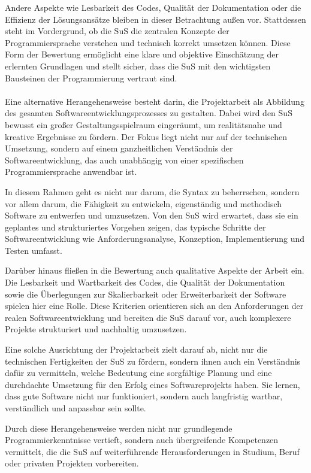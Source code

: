 \documentclass[a4paper,12pt]{article}
\begin{document}
Andere Aspekte wie Lesbarkeit des Codes, Qualität der Dokumentation oder die Effizienz der Lösungsansätze bleiben in dieser Betrachtung außen vor. Stattdessen steht im Vordergrund, ob die SuS die zentralen Konzepte der Programmiersprache verstehen und technisch korrekt umsetzen können. Diese Form der Bewertung ermöglicht eine klare und objektive Einschätzung der erlernten Grundlagen und stellt sicher, dass die SuS mit den wichtigsten Bausteinen der Programmierung vertraut sind.\\
\\

Eine alternative Herangehensweise besteht darin, die Projektarbeit als Abbildung des gesamten Softwareentwicklungsprozesses zu gestalten. Dabei wird den SuS bewusst ein großer Gestaltungsspielraum eingeräumt, um realitätsnahe und kreative Ergebnisse zu fördern. Der Fokus liegt nicht nur auf der technischen Umsetzung, sondern auf einem ganzheitlichen Verständnis der Softwareentwicklung, das auch unabhängig von einer spezifischen Programmiersprache anwendbar ist.

In diesem Rahmen geht es nicht nur darum, die Syntax zu beherrschen, sondern vor allem darum, die Fähigkeit zu entwickeln, eigenständig und methodisch Software zu entwerfen und umzusetzen. Von den SuS wird erwartet, dass sie ein geplantes und strukturiertes Vorgehen zeigen, das typische Schritte der Softwareentwicklung wie Anforderungsanalyse, Konzeption, Implementierung und Testen umfasst.

Darüber hinaus fließen in die Bewertung auch qualitative Aspekte der Arbeit ein. Die Lesbarkeit und Wartbarkeit des Codes, die Qualität der Dokumentation sowie die Überlegungen zur Skalierbarkeit oder Erweiterbarkeit der Software spielen hier eine Rolle. Diese Kriterien orientieren sich an den Anforderungen der realen Softwareentwicklung und bereiten die SuS darauf vor, auch komplexere Projekte strukturiert und nachhaltig umzusetzen.

Eine solche Ausrichtung der Projektarbeit zielt darauf ab, nicht nur die technischen Fertigkeiten der SuS zu fördern, sondern ihnen auch ein Verständnis dafür zu vermitteln, welche Bedeutung eine sorgfältige Planung und eine durchdachte Umsetzung für den Erfolg eines Softwareprojekts haben. Sie lernen, dass gute Software nicht nur funktioniert, sondern auch langfristig wartbar, verständlich und anpassbar sein sollte.

Durch diese Herangehensweise werden nicht nur grundlegende Programmierkenntnisse vertieft, sondern auch übergreifende Kompetenzen vermittelt, die die SuS auf weiterführende Herausforderungen in Studium, Beruf oder privaten Projekten vorbereiten.
\end{document}
